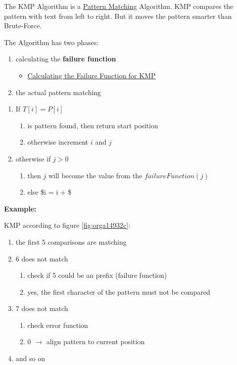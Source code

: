 \documentclass[11pt,twoside,twocolumn,landscape]{article}
\begin{document}
The KMP Algorithm is a \href{../../../roam/20211215163350-pattern_matching.org}{Pattern Matching} Algorithm.
KMP compares the pattern with text from left to right.
But it moves the pattern smarter than Brute-Force.

The Algorithm has two phases:
\begin{enumerate}
\item calculating the \textbf{failure function}
\begin{itemize}
\item \href{../../../roam/20211215171140-calculating_the_failure_function_for_kmp.org}{Calculating the Failure Function for KMP}
\end{itemize}
\item the actual pattern matching
\end{enumerate}


\begin{enumerate}
\item If \(T[i] = P[i]\)
\begin{enumerate}
\item is pattern found, then return start position
\item otherwise increment \(i\) and \(j\)
\end{enumerate}
\item otherwise if \(j > 0\) 
\begin{enumerate}
\item then \(j\) will become the value from the \(failureFunction(j)\)
\item else \$i = i + \$
\end{enumerate}
\end{enumerate}


\textbf{Example:}

KMP according to figure \ref{fig:orga14932c}:
\begin{enumerate}
\item the first 5 comparisons are matching
\item 6 does not match
\begin{enumerate}
\item check if 5 could be an prefix (failure function)
\item yes, the first character of the pattern must not be compared
\end{enumerate}
\item 7 does not match
\begin{enumerate}
\item check error function
\item 0 \(\rightarrow\) align pattern to current position
\end{enumerate}
\item and so on
\end{enumerate}
\end{document}
